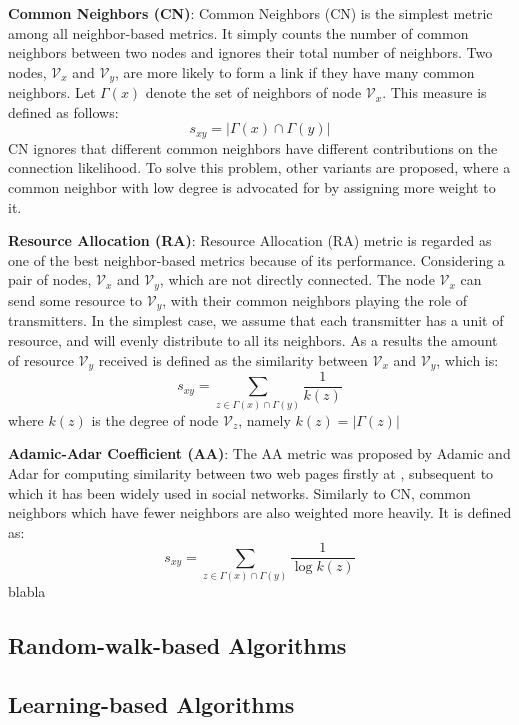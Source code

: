 \documentclass[\main/thesis.tex]{subfiles}
\begin{document}
\textbf{Common Neighbors (CN)}: Common Neighbors (CN) \cite{newman2001clustering} is the simplest metric among all neighbor-based metrics. It simply counts the number of common neighbors between two nodes and ignores their total number of neighbors. Two nodes, $\mathcal{V}_x$ and $\mathcal{V}_y$, are more likely to form a link if they have many common neighbors. Let $\Gamma(x)$ denote the set of neighbors of node $\mathcal{V}_x$. This measure is defined as follows:
\begin{equation}
s_{xy}=|\Gamma(x)\cap\Gamma(y)|
\end{equation}
CN ignores that different common neighbors have different contributions on the connection likelihood. To solve this problem, other variants are proposed, where a common neighbor with low degree is advocated for by assigning more weight to it. 

\textbf{Resource Allocation (RA)}: Resource Allocation (RA) \cite{zhou2009predicting} metric is regarded as one of the best neighbor-based metrics because of its performance. Considering a pair of nodes, $\mathcal{V}_x$ and $\mathcal{V}_y$, which are not directly connected. The node $\mathcal{V}_x$ can send some resource to $\mathcal{V}_y$, with their common neighbors playing the role of transmitters. In the simplest case, we assume that each transmitter has a unit of resource, and will evenly distribute to all its neighbors. As a results the amount of resource $\mathcal{V}_y$ received is defined as the similarity
between $\mathcal{V}_x$ and $\mathcal{V}_y$, which is:
\begin{equation}
s_{xy}=\sum_{z\in \Gamma(x)\cap\Gamma(y)}\frac{1}{k(z)}
\end{equation}
where $k(z)$ is the degree of node $\mathcal{V}_z$, namely $k(z) = |\Gamma(z)|$

\textbf{Adamic-Adar Coefficient (AA)}: The AA metric was proposed by Adamic and Adar for computing similarity between two web pages firstly at \cite{adamic2003friends}, subsequent to which it has been widely used in social networks. Similarly to CN, common neighbors which have fewer neighbors are also weighted more heavily. It is defined as:
\begin{equation}
s_{xy}=\sum_{z\in \Gamma(x)\cap\Gamma(y)}\frac{1}{\log{k(z)}}
\end{equation}
blabla

\subsection{Random-walk-based Algorithms}

\subsection{Learning-based Algorithms}
\end{document}
